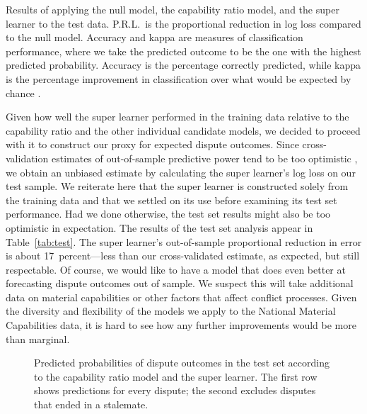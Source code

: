 \begin{table}[tp]
  \centering
  
  \caption{
    Results of applying the null model, the capability ratio model, and the super learner to the test data.
    P.R.L.\ is the proportional reduction in log loss compared to the null model.
    Accuracy and kappa are measures of classification performance, where we take the predicted outcome to be the one with the highest predicted probability.
    Accuracy is the percentage correctly predicted, while kappa is the percentage improvement in classification over what would be expected by chance \citep{Carletta:1996uk}.
  }
  \label{tab:test}
\end{table}

Given how well the super learner performed in the training data relative to the capability ratio and the other individual candidate models, we decided to proceed with it to construct our proxy for expected dispute outcomes.
Since cross-validation estimates of out-of-sample predictive power tend to be too optimistic \citep{Tibshirani:2009tz}, we obtain an unbiased estimate by calculating the super learner's log loss on our test sample.
We reiterate here that the super learner is constructed solely from the training data and that we settled on its use before examining its test set performance.
Had we done otherwise, the test set results might also be too optimistic in expectation.
The results of the test set analysis appear in Table~\ref{tab:test}.
The super learner's out-of-sample proportional reduction in error is about 17~percent---less than our cross-validated estimate, as expected, but still respectable.
Of course, we would like to have a model that does even better at forecasting dispute outcomes out of sample.
We suspect this will take additional data on material capabilities or other factors that affect conflict processes.
Given the diversity and flexibility of the models we apply to the National Material Capabilities data, it is hard to see how any further improvements would be more than marginal.

\begin{figure}[tp]
  \centering
  
  \vspace{-6em}
  \caption{
    Predicted probabilities of dispute outcomes in the test set according to the capability ratio model and the super learner.
    The first row shows predictions for every dispute; the second excludes disputes that ended in a stalemate.
  }
  \label{fig:tern}
\end{figure}

